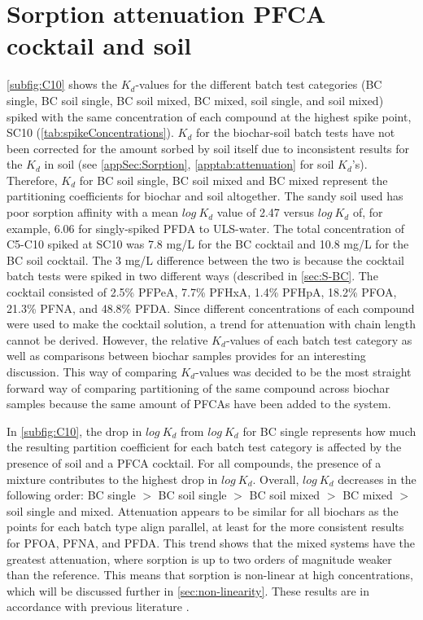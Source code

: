 
\section{Sorption attenuation PFCA cocktail and soil}
\cref{subfig:C10} shows the $K_d$-values for the different batch test categories (BC single, BC soil single, BC soil mixed, BC mixed, soil single, and soil mixed) spiked with the same concentration of each compound at the highest spike point, SC10 (\cref{tab:spikeConcentrations}). $K_d$ for the biochar-soil batch tests have not been corrected for the amount sorbed by soil itself due to inconsistent results for the $K_d$ in soil (see \cref{appSec:Sorption}, \cref{apptab:attenuation} for soil $K_d$'s). Therefore, $K_d$ for BC soil single, BC soil mixed and BC mixed represent the partitioning coefficients for biochar and soil altogether. The sandy soil used has poor sorption affinity with a mean $log~K_d$ value of 2.47 versus $log~K_d$ of, for example, 6.06 for singly-spiked PFDA to ULS-water. The total concentration of C5-C10 spiked at SC10 was 7.8 mg/L for the BC cocktail and 10.8 mg/L for the BC soil cocktail. The 3 mg/L difference between the two is because the cocktail batch tests were spiked in two different ways (described in \cref{sec:S-BC}. The cocktail consisted of 2.5\% PFPeA, 7.7\% PFHxA, 1.4\% PFHpA, 18.2\% PFOA, 21.3\% PFNA, and 48.8\% PFDA. Since different concentrations of each compound were used to make the cocktail solution, a trend for attenuation with chain length cannot be derived. However, the relative $K_d$-values of each batch test category as well as comparisons between biochar samples provides for an interesting discussion. This way of comparing $K_d$-values was decided to be the most straight forward way of comparing partitioning of the same compound across biochar samples because the same amount of PFCAs have been added to the system.

In \cref{subfig:C10}, the drop in $log~K_d$ from $log~K_d$ for BC single represents how much the resulting partition coefficient for each batch test category is affected by the presence of soil and a PFCA cocktail. For all compounds, the presence of a mixture contributes to the highest drop in $log~K_d$. Overall, $log~K_d$ decreases in the following order: BC single $>$ BC soil single $>$ BC soil mixed $>$ BC mixed $>$ soil single and mixed. Attenuation appears to be similar for all biochars as the points for each batch type align parallel, at least for the more consistent results for PFOA, PFNA, and PFDA. This trend shows that the mixed systems have the greatest attenuation, where sorption is up to two orders of magnitude weaker than the reference. This means that sorption is non-linear at high concentrations, which will be discussed further in \cref{sec:non-linearity}. These results are in accordance with previous literature \citep{deng2010removal,zhou2010sorption}.

